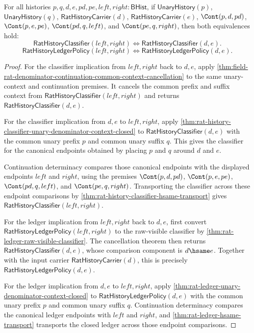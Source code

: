 \begin{theorem}
\label{thm:field-rat-denominator-continuation-common-context-exactness-package}
For all histories $p,q,d,e,pd,pe,left,right:\mathsf{BHist}$, if
$\mathsf{UnaryHistory}(p)$, $\mathsf{UnaryHistory}(q)$,
$\mathsf{RatHistoryCarrier}(d)$, $\mathsf{RatHistoryCarrier}(e)$,
$\Cont(p,d,pd)$, $\Cont(p,e,pe)$, $\Cont(pd,q,left)$, and
$\Cont(pe,q,right)$, then both equivalences hold:
$$
\mathsf{RatHistoryClassifier}(left,right)\Longleftrightarrow
\mathsf{RatHistoryClassifier}(d,e).
$$
$$
\mathsf{RatHistoryLedgerPolicy}(left,right)\Longleftrightarrow
\mathsf{RatHistoryLedgerPolicy}(d,e).
$$
\end{theorem}
\begin{proof}
For the classifier implication from $left,right$ back to $d,e$, apply
\autoref{thm:field-rat-denominator-continuation-common-context-cancellation}
to the same unary-context and continuation premises. It cancels the common
prefix and suffix context from $\mathsf{RatHistoryClassifier}(left,right)$ and
returns $\mathsf{RatHistoryClassifier}(d,e)$.

For the classifier implication from $d,e$ to $left,right$, apply
\autoref{thm:rat-history-classifier-unary-denominator-context-closed} to
$\mathsf{RatHistoryClassifier}(d,e)$ with the common unary prefix $p$ and common
unary suffix $q$. This gives the classifier for the canonical endpoints obtained
by placing $p$ and $q$ around $d$ and $e$.

Continuation determinacy compares those canonical endpoints with the displayed
endpoints $left$ and $right$, using the premises $\Cont(p,d,pd)$,
$\Cont(p,e,pe)$, $\Cont(pd,q,left)$, and $\Cont(pe,q,right)$. Transporting the
classifier across these endpoint comparisons by
\autoref{thm:rat-history-classifier-hsame-transport} gives
$\mathsf{RatHistoryClassifier}(left,right)$.

For the ledger implication from $left,right$ back to $d,e$, first convert
$\mathsf{RatHistoryLedgerPolicy}(left,right)$ to the raw-visible classifier by
\autoref{thm:rat-ledger-raw-visible-classifier}. The cancellation theorem then
returns $\mathsf{RatHistoryClassifier}(d,e)$, whose comparison component is
$d\hsame e$. Together with the input carrier $\mathsf{RatHistoryCarrier}(d)$,
this is precisely $\mathsf{RatHistoryLedgerPolicy}(d,e)$.

For the ledger implication from $d,e$ to $left,right$, apply
\autoref{thm:rat-ledger-unary-denominator-context-closed} to
$\mathsf{RatHistoryLedgerPolicy}(d,e)$ with the common unary prefix $p$ and
common unary suffix $q$. Continuation determinacy compares the canonical ledger
endpoints with $left$ and $right$, and
\autoref{thm:rat-ledger-hsame-transport} transports the closed ledger across
those endpoint comparisons.
\end{proof}

